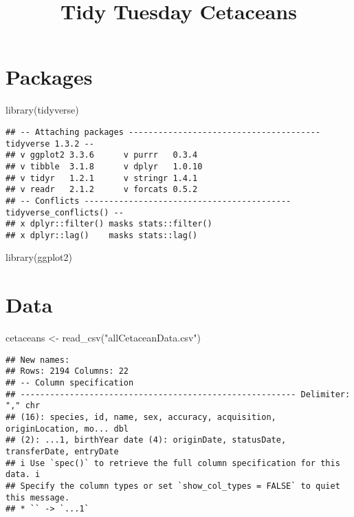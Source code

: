 \documentclass[
]{article}
\title{Tidy Tuesday Cetaceans}
\author{}
\date{\vspace{-2.5em}}
\newenvironment{Shaded}{\begin{snugshade}}{\end{snugshade}}
\newcommand{\FunctionTok}[1]{\textcolor[rgb]{0.00,0.00,0.00}{#1}}
\newcommand{\NormalTok}[1]{#1}
\newcommand{\OtherTok}[1]{\textcolor[rgb]{0.56,0.35,0.01}{#1}}
\newcommand{\StringTok}[1]{\textcolor[rgb]{0.31,0.60,0.02}{#1}}
\begin{document}
\maketitle

\hypertarget{packages}{%
\section{Packages}\label{packages}}

\begin{Shaded}
\begin{Highlighting}[]
\FunctionTok{library}\NormalTok{(tidyverse)}
\end{Highlighting}
\end{Shaded}

\begin{verbatim}
## -- Attaching packages --------------------------------------- tidyverse 1.3.2 --
## v ggplot2 3.3.6      v purrr   0.3.4 
## v tibble  3.1.8      v dplyr   1.0.10
## v tidyr   1.2.1      v stringr 1.4.1 
## v readr   2.1.2      v forcats 0.5.2 
## -- Conflicts ------------------------------------------ tidyverse_conflicts() --
## x dplyr::filter() masks stats::filter()
## x dplyr::lag()    masks stats::lag()
\end{verbatim}

\begin{Shaded}
\begin{Highlighting}[]
\FunctionTok{library}\NormalTok{(ggplot2)}
\end{Highlighting}
\end{Shaded}

\hypertarget{data}{%
\section{Data}\label{data}}

\begin{Shaded}
\begin{Highlighting}[]
\NormalTok{cetaceans }\OtherTok{\textless{}{-}} \FunctionTok{read\_csv}\NormalTok{(}\StringTok{"allCetaceanData.csv"}\NormalTok{)}
\end{Highlighting}
\end{Shaded}

\begin{verbatim}
## New names:
## Rows: 2194 Columns: 22
## -- Column specification
## -------------------------------------------------------- Delimiter: "," chr
## (16): species, id, name, sex, accuracy, acquisition, originLocation, mo... dbl
## (2): ...1, birthYear date (4): originDate, statusDate, transferDate, entryDate
## i Use `spec()` to retrieve the full column specification for this data. i
## Specify the column types or set `show_col_types = FALSE` to quiet this message.
## * `` -> `...1`
\end{verbatim}
\end{document}

